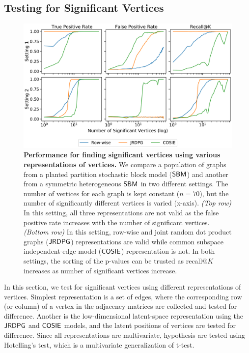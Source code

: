 \subsection{Testing for Significant Vertices}

\begin{figure} 
    \centering
    \includegraphics[width=.8\textwidth]{figures/dnd/exp7_new}
    \caption{
    \textbf{Performance for finding significant vertices using various representations of vertices.} We compare a population of graphs from a planted partition stochastic block model ($\operatorname{\mathsf{SBM}}$) and another from a symmetric heterogeneous $\operatorname{\mathsf{SBM}}$ in two different settings. The number of vertices for each graph is kept constant ($n=70$), but the number of significantly different vertices is varied (x-axis). \textit{(Top row)} In this setting, all three representations are not valid as the false positive rate increases with the number of significant vertices. \textit{(Bottom row)} In this setting, row-wise and joint random dot product graphs ($\operatorname{\mathsf{JRDPG}}$) representations are valid while common subspace independent-edge model ($\operatorname{\mathsf{COSIE}}$) representation is not. 
    In both settings, the sorting of the p-values can be trusted as recall@$K$ increases as number of significant vertices increase.
    }
    \label{fig:exp7}
\end{figure} 


In this section, we test for significant vertices using different representations of vertices. 
Simplest representation is a set of edges, where the corresponding row (or column) of a vertex in the adjacency matrices are collected and tested for difference. 
Another is the low-dimensional latent-space representation using the $\operatorname{\mathsf{JRDPG}}$ and $\operatorname{\mathsf{COSIE}}$ models, and the latent positions of vertices are tested for difference. Since all representations are multivariate, hypothesis are tested using Hotelling's test, which is a multivariate generalization of t-test.

